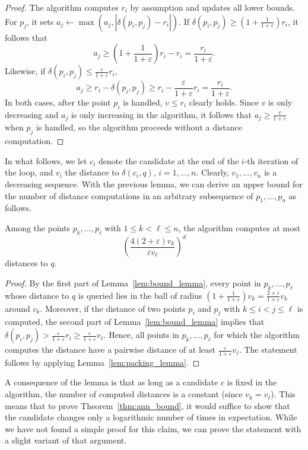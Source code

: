 \documentclass[a4paper,UKenglish,cleveref, autoref]{lipics-v2019}
\newcommand{\eps}{\varepsilon}
\newcommand{\dist}{\delta}
\begin{document}
\begin{proof}
The algorithm computes $r_i$ by assumption and updates
all lower bounds. For $p_j$, it sets $a_j\gets \max (a_j,|\dist(p_i,p_j)-r_i|)$.
If $\dist(p_i,p_j)\geq (1+\frac{1}{1+\eps})r_i$, it follows that 
\[a_j\geq (1+\frac{1}{1+\eps})r_i - r_i = \frac{r_i}{1+\eps}.\]
Likewise, if $\dist(p_i,p_j)\leq\frac{\eps}{1+\eps}r_i$,
\[a_j\geq r_i-\dist(p_i,p_j) \geq r_i - \frac{\eps}{1+\eps}r_i = \frac{r_i}{1+\eps}.\]
In both cases, after the point $p_i$ is handled,
$v\leq r_i$ clearly holds. Since $v$ is only decreasing
and $a_j$ is only increasing in the algorithm,
it follows that $a_j\geq \frac{v}{1+\eps}$ when $p_j$ is handled,
so the algorithm proceeds without a distance computation.
\end{proof}

In what follows, we let $c_i$ denote the candidate
at the end of the $i$-th iteration of the loop, and $v_i$
the distance to $\dist(c_i, q)$, $i = 1, \dots, n$. Clearly, $v_1,\ldots,v_n$ is a decreasing sequence.
With the previous lemma, we can derive an upper bound for the number
of distance computations in an arbitrary subsequence of $p_1,\ldots,p_n$
as follows. 

\begin{lemma}
\label{lem:sequence_lemma}
Among the points $p_k,\ldots,p_\ell$ with $1\leq k< \ell\leq n$, the algorithm computes at most
\[\left(\frac{4(2+\eps) v_k}{\eps v_\ell}\right)^{d}\]
distances to $q$.
\end{lemma}
\begin{proof}
By the first part of Lemma~\ref{lem:bound_lemma}, every point in $p_k,\ldots,p_\ell$
whose distance to $q$ is queried lies in the ball of radius $(1+\frac{1}{1+\eps})v_k=\frac{2+\eps}{1+\eps} v_k$
around $c_k$. Moreover, if the distance of two points $p_i$ and $p_j$ with $k\leq i<j\leq\ell$
is computed, the second part of Lemma~\ref{lem:bound_lemma} implies that $\dist(p_i,p_j)> \frac{\eps}{1+\eps}r_i\geq \frac{\eps}{1+\eps}v_\ell$.
Hence, all points in $p_k,\ldots,p_\ell$ for which the algorithm computes the distance
have a pairwise distance of at least $\frac{\eps}{1+\eps}v_\ell$. The statement follows by applying Lemma~\ref{lem:packing_lemma}.
\end{proof}

A consequence of the lemma is that as long as a candidate $c$ is fixed in the algorithm,
the number of computed distances is a constant (since $v_k=v_\ell$). 
This means that to prove Theorem~\ref{thm:ann_bound}, it would suffice to show
that the candidate changes only a logarithmic number of times in expectation.
While we have not found a simple proof for this claim, we can prove the statement with a slight variant of
that argument.
\end{document}
